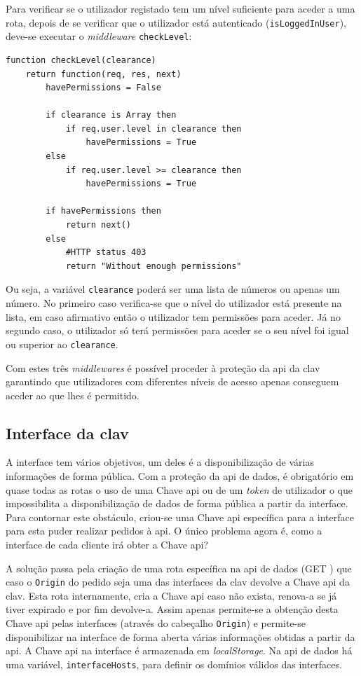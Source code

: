Para verificar se o utilizador registado tem um nível suficiente para aceder a uma rota, depois de se verificar que o utilizador está autenticado (\texttt{isLoggedInUser}), deve-se executar o \textit{middleware} \texttt{checkLevel}:
\begin{lstlisting}[language=pseudocode, caption=Verificação se um utilizador registado tem permissões suficientes para aceder a uma determinada rota]
function checkLevel(clearance)
    return function(req, res, next)
        havePermissions = False

        if clearance is Array then
            if req.user.level in clearance then
                havePermissions = True
        else
            if req.user.level >= clearance then
                havePermissions = True

        if havePermissions then
            return next()
        else
            #HTTP status 403
            return "Without enough permissions"
\end{lstlisting}
Ou seja, a variável \texttt{clearance} poderá ser uma lista de números ou apenas um número. No primeiro caso verifica-se que o nível do utilizador está presente na lista, em caso afirmativo então o utilizador tem permissões para aceder. Já no segundo caso, o utilizador só terá permissões para aceder se o seu nível foi igual ou superior ao \texttt{clearance}.

Com estes três \textit{middlewares} é possível proceder à proteção da \acrshort{api} da \acrshort{clav} garantindo que utilizadores com diferentes níveis de acesso apenas conseguem aceder ao que lhes é permitido.

\subsection{Interface da \acrshort{clav}}

A interface tem vários objetivos, um deles é a disponibilização de várias informações de forma pública. Com a proteção da \acrshort{api} de dados, é obrigatório em quase todas as rotas o uso de uma Chave \acrshort{api} ou de um \textit{token} de utilizador o que impossibilita a disponibilização de dados de forma pública a partir da interface. Para contornar este obstáculo, criou-se uma Chave \acrshort{api} específica para a interface para esta puder realizar pedidos à \acrshort{api}. O único problema agora é, como a interface de cada cliente irá obter a Chave \acrshort{api}?

A solução passa pela criação de uma rota específica na \acrshort{api} de dados (GET ) que caso o \texttt{Origin} do pedido seja uma das interfaces da \acrshort{clav} devolve a Chave \acrshort{api} da \acrshort{clav}. Esta rota internamente, cria a Chave \acrshort{api} caso não exista, renova-a se já tiver expirado e por fim devolve-a. Assim apenas permite-se a obtenção desta Chave \acrshort{api} pelas interfaces (através do cabeçalho \texttt{Origin}) e permite-se disponibilizar na interface de forma aberta várias informações obtidas a partir da \acrshort{api}. A Chave \acrshort{api} na interface é armazenada em \textit{localStorage}. Na \acrshort{api} de dados há uma variável, \texttt{interfaceHosts}, para definir os domínios válidos das interfaces.

